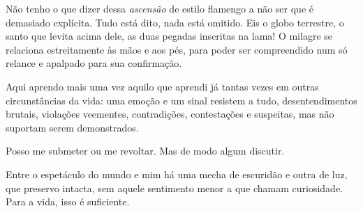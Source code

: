 Não tenho o que dizer dessa \emph{ascensão} de estilo flamengo a não ser
que é demasiado explícita. Tudo está dito, nada está omitido. Eis o
globo terrestre, o santo que levita acima dele, as duas pegadas
inscritas na lama! O milagre se relaciona estreitamente às mãos e aos
pés, para poder ser compreendido num só relance e apalpado para sua
confirmação.

Aqui aprendo mais uma vez aquilo que aprendi já tantas vezes em outras
circunstâncias da vida: uma emoção e um sinal resistem a tudo,
desentendimentos brutais, violações veementes, contradições,
contestações e suspeitas, mas não suportam serem demonstrados.

Posso me submeter ou me revoltar. Mas de modo algum discutir.

Entre o espetáculo do mundo e mim há uma mecha de escuridão e outra de
luz, que preservo intacta, sem aquele sentimento menor a que chamam
curiosidade. Para a vida, isso é suficiente.
